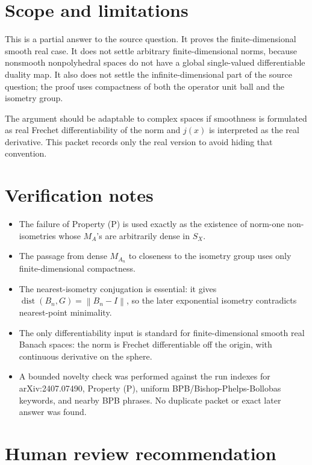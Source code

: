\documentclass[11pt]{article}
\newcommand{\SX}{S_X}
\newcommand{\dist}{\operatorname{dist}}
\newcommand{\norm}[1]{\left\lVert #1 \right\rVert}
\begin{document}
\section*{Scope and limitations}

This is a partial answer to the source question.  It proves the
finite-dimensional smooth real case.  It does not settle arbitrary
finite-dimensional norms, because nonsmooth nonpolyhedral spaces do not have a
global single-valued differentiable duality map.  It also does not settle the
infinite-dimensional part of the source question; the proof uses compactness
of both the operator unit ball and the isometry group.

The argument should be adaptable to complex spaces if smoothness is formulated
as real Frechet differentiability of the norm and \(j(x)\) is interpreted as
the real derivative.  This packet records only the real version to avoid hiding
that convention.

\section*{Verification notes}

\begin{itemize}
\item The failure of Property (P) is used exactly as the existence of
  norm-one non-isometries whose \(M_A\)'s are arbitrarily dense in \(\SX\).
\item The passage from dense \(M_{A_n}\) to closeness to the isometry group
  uses only finite-dimensional compactness.
\item The nearest-isometry conjugation is essential: it gives
  \(\dist(B_n,G)=\norm{B_n-I}\), so the later exponential isometry contradicts
  nearest-point minimality.
\item The only differentiability input is standard for finite-dimensional
  smooth real Banach spaces: the norm is Frechet differentiable off the origin,
  with continuous derivative on the sphere.
\item A bounded novelty check was performed against the run indexes for
  arXiv:2407.07490, Property (P), uniform BPB/Bishop-Phelps-Bollobas keywords,
  and nearby BPB phrases.  No duplicate packet or exact later answer was found.
\end{itemize}

\section*{Human review recommendation}
\end{document}
